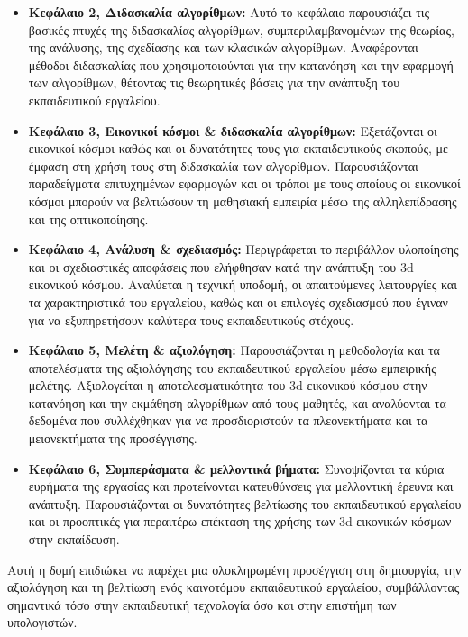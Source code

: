 \begin{itemize}
    \item \textbf{Κεφάλαιο 2, Διδασκαλία αλγορίθμων:} Αυτό το κεφάλαιο παρουσιάζει τις βασικές πτυχές της διδασκαλίας αλγορίθμων, συμπεριλαμβανομένων της θεωρίας, της ανάλυσης, της σχεδίασης και των κλασικών αλγορίθμων. Αναφέρονται μέθοδοι διδασκαλίας που χρησιμοποιούνται για την κατανόηση και την εφαρμογή των αλγορίθμων, θέτοντας τις θεωρητικές βάσεις για την ανάπτυξη του εκπαιδευτικού εργαλείου.

    \item \textbf{Κεφάλαιο 3, Εικονικοί κόσμοι \& διδασκαλία αλγορίθμων:} Εξετάζονται οι εικονικοί κόσμοι καθώς και οι δυνατότητες τους για εκπαιδευτικούς σκοπούς, με έμφαση στη χρήση τους στη διδασκαλία των αλγορίθμων. Παρουσιάζονται παραδείγματα επιτυχημένων εφαρμογών και οι τρόποι με τους οποίους οι εικονικοί κόσμοι μπορούν να βελτιώσουν τη μαθησιακή εμπειρία μέσω της αλληλεπίδρασης και της οπτικοποίησης.

    \item \textbf{Κεφάλαιο 4, Ανάλυση \& σχεδιασμός:} Περιγράφεται το περιβάλλον υλοποίησης και οι σχεδιαστικές αποφάσεις που ελήφθησαν κατά την ανάπτυξη του \acrshort{3d} εικονικού κόσμου. Αναλύεται η τεχνική υποδομή, οι απαιτούμενες λειτουργίες και τα χαρακτηριστικά του εργαλείου, καθώς και οι επιλογές σχεδιασμού που έγιναν για να εξυπηρετήσουν καλύτερα τους εκπαιδευτικούς στόχους.

    \item \textbf{Κεφάλαιο 5, Μελέτη \& αξιολόγηση:} Παρουσιάζονται η μεθοδολογία και τα αποτελέσματα της αξιολόγησης του εκπαιδευτικού εργαλείου μέσω εμπειρικής μελέτης. Αξιολογείται η αποτελεσματικότητα του \acrshort{3d} εικονικού κόσμου στην κατανόηση και την εκμάθηση αλγορίθμων από τους μαθητές, και αναλύονται τα δεδομένα που συλλέχθηκαν για να προσδιοριστούν τα πλεονεκτήματα και τα μειονεκτήματα της προσέγγισης.

    \item \textbf{Κεφάλαιο 6, Συμπεράσματα \& μελλοντικά βήματα:} Συνοψίζονται τα κύρια ευρήματα της εργασίας και προτείνονται κατευθύνσεις για μελλοντική έρευνα και ανάπτυξη. Παρουσιάζονται οι δυνατότητες βελτίωσης του εκπαιδευτικού εργαλείου και οι προοπτικές για περαιτέρω επέκταση της χρήσης των \acrshort{3d} εικονικών κόσμων στην εκπαίδευση.
\end{itemize}

Αυτή η δομή επιδιώκει να παρέχει μια ολοκληρωμένη προσέγγιση στη δημιουργία, την αξιολόγηση και τη βελτίωση ενός καινοτόμου εκπαιδευτικού εργαλείου, συμβάλλοντας σημαντικά τόσο στην εκπαιδευτική τεχνολογία όσο και στην επιστήμη των υπολογιστών.
